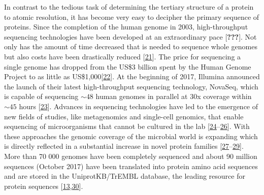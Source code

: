 \documentclass[11pt,a4paper,twoside]{book}
\theoremstyle{definition}
\theoremstyle{definition}
\theoremstyle{remark}
\begin{document}
In contrast to the tedious task of determining the tertiary structure of
a protein to atomic resolution, it has become very easy to decipher the
primary sequence of proteins. Since the completion of the human genome
in 2003, high-throughput sequencing technologies have been developed at
an extraordinary pace {[}{\textbf{???}}{]}. Not only has the amount of
time decreased that is needed to sequence whole genomes but also costs
have been drastically reduced
{[}\protect\hyperlink{ref-Reuter2015}{21}{]}. The price for sequencing a
single genome has dropped from the US\$3 billion spent by the Human
Genome Project to as little as
US\$1,000{[}\protect\hyperlink{ref-Goodwin2016}{22}{]}. At the beginning
of 2017, Illumina announced the launch of their latest high-throughput
sequencing technology, NovaSeq, which is capable of sequencing
\(\sim \! 48\) human genomes in parallel at 30x coverage within
\(\sim \! 45\) hours
{[}\protect\hyperlink{ref-NovaSeqSystemSpecifications}{23}{]}. Advances
in sequencing technologies have led to the emergence of new fields of
studies, like metagenomics and single-cell genomics, that enable
sequencing of microorganisms that cannot be cultured in the lab
{[}\protect\hyperlink{ref-Tringe2005}{24}--\protect\hyperlink{ref-Wooley2010}{26}{]}.
With these approaches the genomic coverage of the microbial world is
expanding which is directly reflected in a substantial increase in novel
protein families
{[}\protect\hyperlink{ref-Rinke2013}{27}--\protect\hyperlink{ref-Forster2017}{29}{]}.
More than 70 000 genomes have been completely sequenced and about 90
million sequences (October 2017) have been translated into protein amino
acid sequences and are stored in the UniprotKB/TrEMBL database, the
leading resource for protein sequences
{[}\protect\hyperlink{ref-TheUniProtConsortium2017}{13},\protect\hyperlink{ref-Zerihun2017}{30}{]}.
\end{document}
